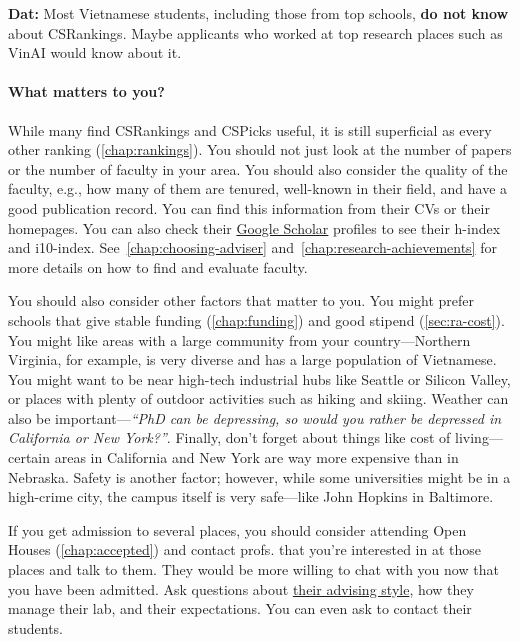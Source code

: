 \documentclass[oneside,11pt]{book}
\newenvironment{commentbox}[1][]{
  \small
  \begin{marker}[\faChessPawn{}]
    {\textbf{#1}}
  }{
  \end{marker}
}
\begin{document}
\begin{commentbox}[Dat:] Most Vietnamese students, including those from top schools, \textbf{do not know} about CSRankings.  Maybe applicants who worked at top research places such as VinAI would know about it.
\end{commentbox}

\paragraph{What matters to you?} While many find CSRankings and CSPicks useful, it is still superficial as every other ranking (\autoref{chap:rankings}).  You should not just look at the number of papers or the number of faculty in your area.  You should also consider the quality of the faculty, e.g., how many of them are tenured,  well-known in their field, and have a good publication record.  You can find this information from their CVs or their homepages.  You can also check their \href{https://scholar.google.com}{Google Scholar} profiles to see their h-index and i10-index. See~\autoref{chap:choosing-adviser} and~\autoref{chap:research-achievements} for more details on how to find and evaluate faculty.

You should also consider other factors that matter to you.  You might prefer schools that give stable funding (\autoref{chap:funding}) and good stipend (\autoref{sec:ra-cost}).  You might like  areas with a large community from your country---Northern Virginia, for example, is very diverse and has a large population of Vietnamese. You might want to be near high-tech industrial hubs like Seattle or Silicon Valley, or places with plenty of outdoor activities such as hiking and skiing.  Weather can also be important---\emph{``PhD can be depressing, so would you rather be depressed in California or New York?''}.  Finally, don't forget about things like cost of living---certain areas in California and New York are way more expensive than in Nebraska. Safety is another factor; however, while some universities might be in a high-crime city, the campus itself is very safe---like John Hopkins in Baltimore.

If you get admission to several places, you should consider attending Open Houses (\autoref{chap:accepted}) and contact profs. that you're interested in at those places and talk to them.  They would be more willing to chat with you now that you have been admitted.  Ask questions about \href{https://roars.dev/phd-cs-us/advising.pdf}{their advising style}, how they manage their lab, and their expectations. You can even ask to contact their students.
\end{document}
